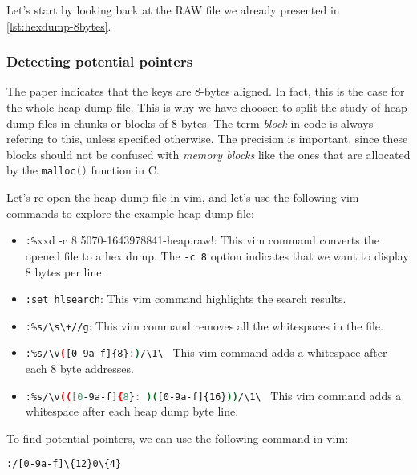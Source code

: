     Let's start by looking back at the RAW file we already presented in \ref{lst:hexdump-8bytes}.

    \subsubsection{Detecting potential pointers}
    The paper  indicates that the keys are 8-bytes aligned. In fact, this is the case for the whole heap dump file. This is why we have choosen to split the study of heap dump files in chunks or blocks of 8 bytes. The term \textit{block} in code is always refering to this, unless specified otherwise. The precision is important, since these blocks should not be confused with \textit{memory blocks} like the ones that are allocated by the \lstinline[language=c]|malloc()| function in C.

    \begin{minipage}{\dimexpr\linewidth-20pt}
        Let's re-open the heap dump file in vim, and let's use the following vim commands to explore the example heap dump file:

        \begin{itemize} 
            \item \lstinline[language=bash]!:%!xxd -c 8  5070-1643978841-heap.raw!: This vim command converts the opened file to a hex dump. The \lstinline[language=bash]!-c 8! option indicates that we want to display 8 bytes per line.
            \item \lstinline[language=bash]!:set hlsearch!: This vim command highlights the search results.
            \item \lstinline[language=bash]!:%s/\s\+//g!: This vim command removes all the whitespaces in the file.
            \item \lstinline[language=bash]!:%s/\v([0-9a-f]{8}:)/\1\ ! This vim command adds a whitespace after each 8 byte addresses.
            \item \lstinline[language=bash]!:%s/\v(([0-9a-f]{8}: )([0-9a-f]{16}))/\1\ ! This vim command adds a whitespace after each heap dump byte line.
        \end{itemize}
    \end{minipage}

    To find potential pointers, we can use the following command in vim:
    \begin{lstlisting}[language=bash, caption={Vim command to find potential pointers}]
        :/[0-9a-f]\{12}0\{4}
    \end{lstlisting}

